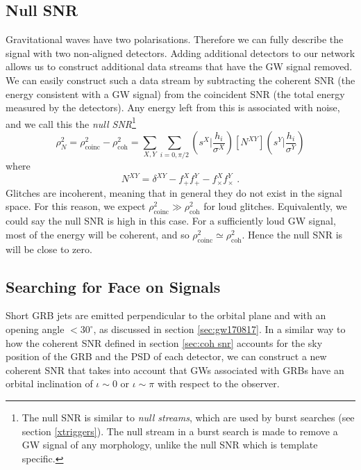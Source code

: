\documentclass[11pt]{cuthesis}
\newcommand{\fs}{\text{ .}}
\begin{document}
\subsection{Null SNR} \label{sec:null snr}
Gravitational waves have two polarisations. Therefore we can fully describe the signal with two non-aligned detectors. Adding additional detectors to our network allows us to construct additional data streams that have the GW signal removed. We can easily construct such a data stream by subtracting the coherent SNR (the energy consistent with a GW signal) from the coincident SNR (the total energy measured by the detectors). Any energy left from this is associated with noise, and we call this the \textit{null SNR}\footnote{The null SNR is similar to \textit{null streams}, which are used by burst searches (see section \ref{xtriggers}). The null stream in a burst search is made to remove a GW signal of any morphology, unlike the null SNR which is template specific.}
\begin{equation} \label{null snr}
\rho_N^2 = \rho_\text{coinc}^2 - \rho_\text{coh}^2 = \sum_{X,Y} \sum_{i=0,\pi/2} \left( s^X \bigg| \frac{h_i}{\sigma^X} \right) [N^{XY}]  \left( s^Y \bigg| \frac{h_i}{\sigma^Y} \right)
\end{equation} 
where
\begin{equation}
N^{XY} = \delta^{XY} - f^X_{+}f^Y_{+} - f^X_{\times}f^Y_{\times} \fs
\end{equation}
Glitches are incoherent, meaning that in general they do not exist in the signal space. For this reason, we expect $\rho_\text{coinc}^2 \gg \rho_\text{coh}^2$ for loud glitches. Equivalently, we could say the null SNR is high in this case. For a sufficiently loud GW signal, most of the energy will be coherent, and so $\rho_\text{coinc}^2 \simeq \rho_\text{coh}^2$. Hence the null SNR is will be close to zero.

\subsection{Searching for Face on Signals} \label{sec:circ pol}
Short GRB jets are emitted perpendicular to the orbital plane and with an opening angle $<30^\circ$, as discussed in section \ref{sec:gw170817}. In a similar way to how the coherent SNR defined in section \ref{sec:coh snr} accounts for the sky position of the GRB and the PSD of each detector, we can construct a new coherent SNR that takes into account that GWs associated with GRBs have an orbital inclination of $\iota \sim 0$ or $\iota \sim \pi$ with respect to the observer.
\end{document}
